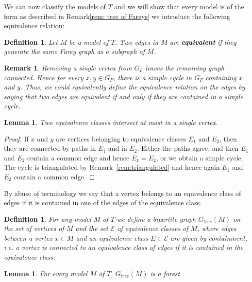 \documentclass[10pt,a4paper]{amsart}
\newcommand{\E}{\mathcal{E}}
\newtheorem{definition}[defi]{Definition}
\newtheorem{lemma}[defi]{Lemma}
\newtheorem{remark}[defi]{Remark}
\begin{document}
We can now classify the models of $T$ and we will show that every model is of the form as described in Remark\ref{rem: tree of Fareys} we introduce the following equivalence relation: 

\begin{definition}
    Let $M$ be a  model of $T$.
   Two edges in $M$ are \textbf{equivalent} if they generate the same Farey graph as a subgraph of $M$. 
\end{definition}


\begin{remark}
    Removing a single vertex from $G_F$ leaves the remaining graph connected. Hence for every $x, y \in G_F$, there is a simple cycle in $G_F$ containing $x$ and $y$. Thus, we could equivalently  define the equivalence relation on the edges by saying that two edges are equivalent if and only if they are contained in a simple cycle.
\end{remark}

\begin{lemma}\label{cluster_lemma}
    Two equivalence classes intersect at most in a single vertex.
    
\end{lemma}

\begin{proof}
    If $x$ and $y$ are vertices belonging to equivalence classes $E_1$ and $E_2$, then they
    are connected by paths in $E_1$ and in $E_2$. Either the paths agree, and
    then $E_1$ and $E_2$ contain a common edge and hence $E_1 = E_2$, or we obtain a simple
    cycle. The cycle is triangulated by Remark~\ref{rem:triangulated} and hence again $E_1$ and $E_2$ contain a common edge.
\end{proof}
 
By abuse of terminology we say that a vertex belongs to an equivalence class of edges if it is contained in one of the edges of the equivalence class.

\begin{definition}\label{def:tree}
For any model $M$ of $T$ we define a bipartite graph $G_{tree}(M)$ on the set of vertices of $M$
and the set $\E$ of equivalence classes of $M$, where edges between a vertex $x\in M$ and an equivalence class $E\in\E$ are given by containment,
i.e. a vertex is connected to an equivalence class of edges if it is contained in the equivalence class.
\end{definition}

\begin{lemma}
    For every model $M$ of $T$, $G_{tree}(M)$ is a forest.
\end{lemma}
\end{document}
